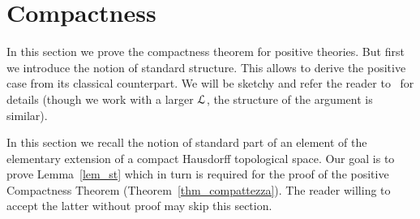 \documentclass{amsproc}
\begin{document}
\begin{comment}
  \ceq{\hfill M\models\varphi(a)}{\Leftrightarrow}{N\models\varphi(fa)}

  for every $a\in({\rm dom }f)^{|x|}$ and every formula $\varphi(x)\in{\EuScript F}^{\rm p}$ without quantifiers of sort ${\sf H}$.
\end{fact}

\begin{proof}
  The equivalence is trivial for formulas in ${\EuScript L}_{\sf H}$ so we only consider atomic formulas of the form $t\in C$.
  Implication $\Rightarrow$ holds by definition. 
  Vice versa, if $M\models \tau(a)\notin C$ then, by normality,  $M\models \tau(a)\in\tilde{C}$ for some compact $\tilde C$ disjoint of $C$.
  By the definition of partial embedding, $N\models \tau(a)\in\tilde{C}$.
  Hence $N\models \tau(a)\notin C$.
  Induction is immediate.
\end{proof}
  
\end{comment}



\section{Compactness}\label{compactness}

\def\ceq#1#2#3{\parbox[t]{18ex}{$\displaystyle #1$}\parbox[t]{6ex}{\hfil $#2$}{$\displaystyle #3$}}

In this section we prove the compactness theorem for positive theories. 
But first we introduce the notion of standard structure.
This allows to derive the positive case from its classical counterpart.
We will be sketchy and refer the reader to~\cite{clcl} for details (though we work with a larger ${\EuScript L}$, the structure of the argument is similar).

In this section we recall the notion of standard part of an element of the elementary extension of a compact Hausdorff topological space.
Our goal is to prove Lemma~\ref{lem_st} which in turn is required for the proof of the positive Compactness Theorem (Theorem~\ref{thm_compattezza}).
The reader willing to accept the latter without proof may skip this section.
\end{document}
